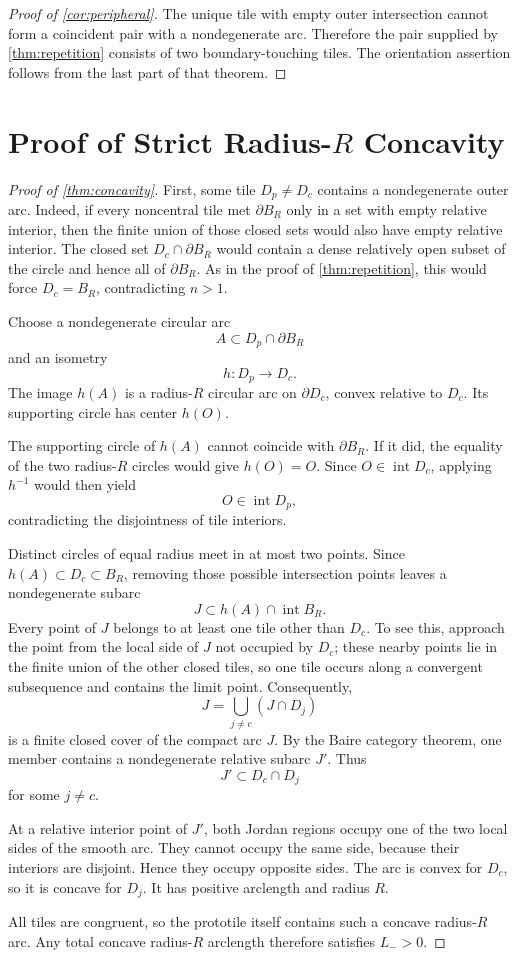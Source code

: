 \documentclass[11pt]{article}
\newcommand{\BR}{B_R}
\newcommand{\interior}{\operatorname{int}}
\begin{document}
\begin{proof}[Proof of \cref{cor:peripheral}]
The unique tile with empty outer intersection cannot form a coincident pair with a nondegenerate arc. Therefore the pair supplied by \cref{thm:repetition} consists of two boundary-touching tiles. The orientation assertion follows from the last part of that theorem.
\end{proof}

\section{Proof of Strict Radius-$R$ Concavity}

\begin{proof}[Proof of \cref{thm:concavity}]
First, some tile $D_p\ne D_c$ contains a nondegenerate outer arc. Indeed, if every noncentral tile met $\partial\BR$ only in a set with empty relative interior, then the finite union of those closed sets would also have empty relative interior. The closed set $D_c\cap\partial\BR$ would contain a dense relatively open subset of the circle and hence all of $\partial\BR$. As in the proof of \cref{thm:repetition}, this would force $D_c=\BR$, contradicting $n>1$.

Choose a nondegenerate circular arc
\[
  A\subset D_p\cap\partial\BR
\]
and an isometry
\[
  h:D_p\longrightarrow D_c.
\]
The image $h(A)$ is a radius-$R$ circular arc on $\partial D_c$, convex relative to $D_c$. Its supporting circle has center $h(O)$.

The supporting circle of $h(A)$ cannot coincide with $\partial\BR$. If it did, the equality of the two radius-$R$ circles would give $h(O)=O$. Since $O\in\interior D_c$, applying $h^{-1}$ would then yield
\[
  O\in\interior D_p,
\]
contradicting the disjointness of tile interiors.

Distinct circles of equal radius meet in at most two points. Since $h(A)\subset D_c\subset\BR$, removing those possible intersection points leaves a nondegenerate subarc
\[
  J\subset h(A)\cap\interior\BR.
\]
Every point of $J$ belongs to at least one tile other than $D_c$. To see this, approach the point from the local side of $J$ not occupied by $D_c$; these nearby points lie in the finite union of the other closed tiles, so one tile occurs along a convergent subsequence and contains the limit point. Consequently,
\[
  J=\bigcup_{j\ne c}(J\cap D_j)
\]
is a finite closed cover of the compact arc $J$. By the Baire category theorem, one member contains a nondegenerate relative subarc $J'$. Thus
\[
  J'\subset D_c\cap D_j
\]
for some $j\ne c$.

At a relative interior point of $J'$, both Jordan regions occupy one of the two local sides of the smooth arc. They cannot occupy the same side, because their interiors are disjoint. Hence they occupy opposite sides. The arc is convex for $D_c$, so it is concave for $D_j$. It has positive arclength and radius $R$.

All tiles are congruent, so the prototile itself contains such a concave radius-$R$ arc. Any total concave radius-$R$ arclength therefore satisfies $L_->0$.
\end{proof}
\end{document}
